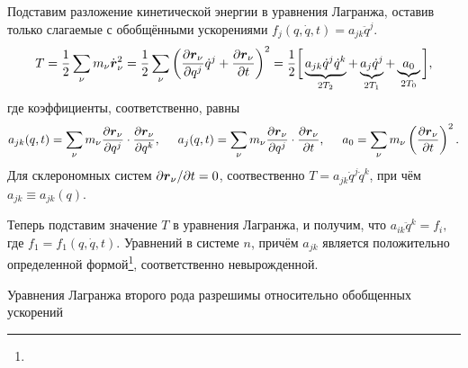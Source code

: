 Подставим разложение кинетической энергии в уравнения Лагранжа, оставив только слагаемые с обобщёнными ускорениями $f_j (q, \dot{q}, t) = a_{jk} \ddot{q}^j$. 
\begin{equation*}
    T = \frac{1}{2} \sum_\nu m_\nu \dot{\mbox{\boldmath $r$}}_\nu^2 = \frac{1}{2} \sum_\nu
    \left(
        \frac{\partial \mbox{\boldmath $r$}_\nu}{\partial q^j} \dot{q}^j + \frac{\partial \mbox{\boldmath $r$}_\nu}{\partial t} 
    \right)^2 = 
    \frac{1}{2} 
    \bigg[
    \underbrace{
        a_{jk} \dot{q}^j \dot{q}^k
    }_{
        2T_2
    } +
    \underbrace{
        a_j \dot{q}^j
    }_{
        2T_1
    } +
    \underbrace{
        a_0
    }_{
        2T_0
    }
    \bigg],
\end{equation*}
где коэффициенты, соответственно, равны 
\begin{equation*}
    a_{jk}(q, t) = \sum_\nu m_\nu \frac{\partial \mbox{\boldmath $r$}_\nu}{\partial q^j} \cdot \frac{\partial \mbox{\boldmath $r$}_\nu}{\partial q^k},
    \hspace{0.5cm} 
    a_j(q, t) = \sum_\nu m_\nu \frac{\partial \mbox{\boldmath $r$}_\nu}{\partial q^j} \cdot \frac{\partial \mbox{\boldmath $r$}_\nu}{\partial t},
    \hspace{0.5cm} 
    a_0 = \sum_\nu m_\nu 
    \left(
    \frac{\partial \mbox{\boldmath $r$}_\nu}{\partial t} 
            \right)^2.
\end{equation*}
Для склерономных систем $\partial \mbox{\boldmath $r$}_\nu / \partial t = 0$, соотвественно $T = a_{jk} \dot{q}^j \dot{q}^k$, при чём $a_{jk} \equiv a_{jk} (q)$.

Теперь подставим значение $T$ в уравнения Лагранжа, и получим, что
$
    a_{ik} \ddot{q}^k = f_i,
$
где $f_1 = f_1(q, \dot{q}, t)$. Уравнений в системе $n$, причём $a_{jk}$ является положительно определенной формой\footnote{
}, соответственно невырожденной. 

\begin{to_thr} 
    Уравнения Лагранжа второго рода разрешимы относительно обобщенных ускорений 
\end{to_thr}
